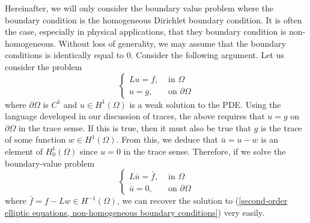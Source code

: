 \documentclass[10pt]{article}
\begin{document}
Hereinafter, we will only consider the boundary value problem where the boundary condition is the homogeneous Dirichlet boundary condition. It is often the case, especially in physical applications, that they boundary condition is non-homogeneous. Without loss of generality, we may assume that the boundary conditions is identically equal to $0$. Consider the following argument. Let us consider the problem 
\begin{equation}
	\label{second-order elliptic equations, non-homogeneous boundary conditions}
	\displaystyle \begin{cases}
		Lu = f, & \textrm{ in } \Omega \\
		u = g, & \textrm{ on } \partial \Omega
	\end{cases}
\end{equation}
where $\partial \Omega$ is $C^1$ and $u \in H^1(\Omega)$ is a weak solution to the PDE. Using the language developed in our discussion of traces, the above requires that $u = g$ on $\partial \Omega$ in the trace sense. If this is true, then it must also be true that $g$ is the trace of some function $w \in H^{1}(\Omega)$. From this, we deduce that $\bar{u} = u - w$ is an element of $H_0^1(\Omega)$ since $u = 0$ in the trace sense. Therefore, if we solve the boundary-value problem
\begin{equation*}
	\displaystyle \begin{cases}
		L\bar{u} = \bar{f}, & \textrm{ in } \Omega \\
		\bar{u} = 0, & \textrm{ on } \partial \Omega 
	\end{cases}
\end{equation*}
where $\bar{f} = f - Lw \in H^{-1}(\Omega)$, we can recover the solution to (\ref{second-order elliptic equations, non-homogeneous boundary conditions}) very easily. 
\end{document}
